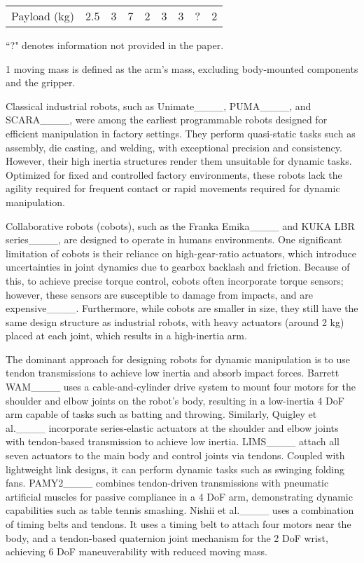 \begin{table*}[ht]
{\begin{threeparttable}
\begin{tabular}{l||c|c|c|c|c|c|c|c}
Payload (kg)                & 2.5     & 3            & 7                & 2              & 3       & 3                      & ?        & 2\\ 
\end{tabular}
\begin{tablenotes}
\item ``?" denotes information not provided in the paper.
\item[1] moving mass is defined as the arm’s mass, excluding body-mounted components and the gripper.
\end{tablenotes}
\end{threeparttable}
}
\end{table*}
Classical industrial robots, such as Unimate____, PUMA____, and SCARA____, were among the earliest programmable robots designed for efficient manipulation in factory settings. They perform quasi-static tasks such as assembly, die casting, and welding, with exceptional precision and consistency. However, their high inertia structures render them unsuitable for dynamic tasks. Optimized for fixed and controlled factory environments, these robots lack the agility required for frequent contact or rapid movements required for dynamic manipulation.

Collaborative robots (cobots), such as the Franka Emika____ and KUKA LBR series____, are designed to operate in humans environments. One significant limitation of cobots is their reliance on high-gear-ratio actuators, which introduce uncertainties in joint dynamics due to gearbox backlash and friction. Because of this, to achieve precise torque control, cobots often incorporate torque sensors; however, these sensors are susceptible to damage from impacts, and are expensive____. Furthermore, while cobots are smaller in size, they still have the same design structure as industrial robots, with heavy actuators (around 2 kg) placed at each joint, which results in a high-inertia arm.

The dominant approach for designing robots for dynamic manipulation is to use tendon transmissions to achieve low inertia and absorb impact forces. Barrett WAM____ uses a cable-and-cylinder drive system to mount four motors for the shoulder and elbow joints on the robot’s body, resulting in a low-inertia 4 DoF arm capable of tasks such as batting and throwing. Similarly, Quigley et al.____ incorporate series-elastic actuators at the shoulder and elbow joints with tendon-based transmission to achieve low inertia. LIMS____ attach all seven actuators to the main body and control joints via tendons. Coupled with lightweight link designs, it can perform dynamic tasks such as swinging folding fans. PAMY2____ combines tendon-driven transmissions with pneumatic artificial muscles for passive compliance in a 4 DoF arm, demonstrating dynamic capabilities such as table tennis smashing. Nishii et al.____ uses a combination of timing belts and tendons. It uses a timing belt to attach four motors near the body, and a tendon-based quaternion joint mechanism for the 2 DoF wrist, achieving 6 DoF maneuverability with reduced moving mass. 

